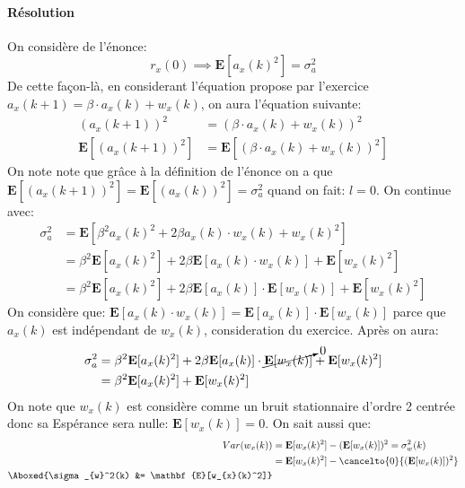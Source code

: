 \documentclass{article}
\begin{document}
\paragraph{Résolution}On considère de l'énonce:
\begin{equation}
    r_{x}(0) \implies \boxed{\mathbf{E}[a_{x}(k)^{2}] = \sigma_{a}^{2}}
\end{equation}
\noindent De cette façon-là, en considerant l'équation propose par l'exercice $a_{x}(k+1) = \beta \cdot a_{x}(k) + w_{x}(k)$, on aura l'équation suivante:
\begin{align*}
    (a_{x}(k+1))^2 &= (\beta \cdot a_{x}(k) + w_{x}(k))^2\\
    \mathbf{E}[(a_{x}(k+1))^2] &= \mathbf{E}[(\beta \cdot a_{x}(k) + w_{x}(k))^2]
\end{align*}
On note note que grâce à la définition de l'énonce on a que $\mathbf{E}[(a_{x}(k+1))^2] = \mathbf{E}[(a_{x}(k))^2] = \sigma_{a}^2$ quand on fait: $l = 0$. On continue avec:
\begin{align*}
    \sigma_{a}^{2} &= \mathbf{E}[\beta^2 a_{x}(k)^{2} + 2 \beta a_{x}(k) \cdot w_{x}(k) + w_{x}(k)^2]\\
    &= \beta^2 \mathbf{E}[a_{x}(k)^{2}] + 2 \beta \mathbf{E}[a_{x}(k) \cdot w_{x}(k)] + \mathbf{E}[w_{x}(k)^2]\\
    &= \beta^2 \mathbf{E}[a_{x}(k)^{2}] + 2 \beta \mathbf{E}[a_{x}(k)] \cdot \mathbf{E}[w_{x}(k)] + \mathbf{E}[w_{x}(k)^2]
\end{align*}
\noindent On considère que: $\mathbf{E}[a_{x}(k) \cdot w_{x}(k)] = \mathbf{E}[a_{x}(k)] \cdot \mathbf{E}[w_{x}(k)]$ parce que $a_{x}(k)$ est indépendant de $w_{x}(k)$, consideration du exercice. Après on aura:
\begin{align*}
    \sigma_{a}^{2} &= \beta^2 \mathbf{E}[a_{x}(k)^{2}] + 2 \beta \mathbf{E}[a_{x}(k)] \cdot \cancelto{0}{\mathbf{E}[w_{x}(k)]} + \mathbf{E}[w_{x}(k)^2]\\
     &= \beta^2 \mathbf{E}[a_{x}(k)^{2}] + \mathbf{E}[w_{x}(k)^2]
\end{align*}
\noindent On note que $w_{x}(k)$ est considère comme un bruit stationnaire d'ordre 2 centrée donc sa Espérance sera nulle: $\mathbf{E}[w_{x}(k)] = 0$. On sait aussi que:
\begin{align*}
     Var(w_{x}(k)) &= \mathbf{E}[w_{x}(k)^2] - (\mathbf{E}[w_{x}(k)])^2 = \sigma_{w}^2(k)\\
     &= \mathbf{E}[w_{x}(k)^2] - \cancelto{0}{(\mathbf{E}[w_{x}(k)])^2}\\
     \Aboxed{\sigma_{w}^2(k) &= \mathbf{E}[w_{x}(k)^2]}
\end{align*}
\end{document}
